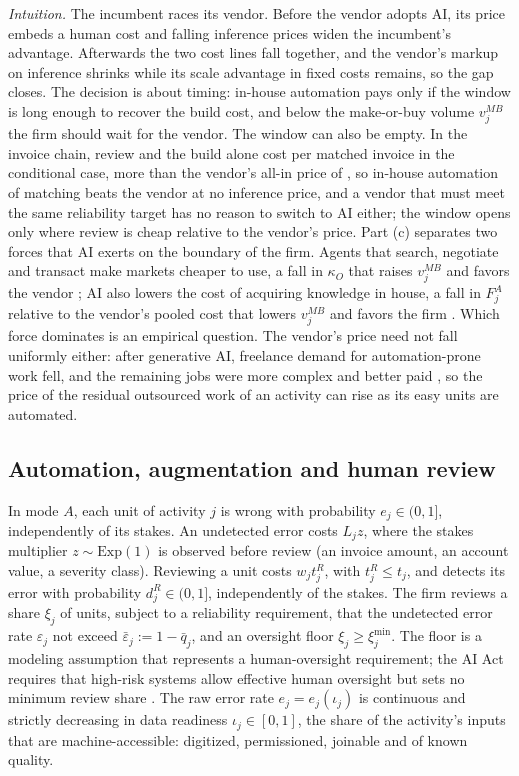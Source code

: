 \noindent\emph{Intuition.} The incumbent races its vendor. Before the vendor adopts AI, its price embeds a human cost and falling inference prices widen the incumbent's advantage. Afterwards the two cost lines fall together, and the vendor's markup on inference shrinks while its scale advantage in fixed costs remains, so the gap closes. The decision is about timing: in-house automation pays only if the window is long enough to recover the build cost, and below the make-or-buy volume $v^{MB}_j$ the firm should wait for the vendor. The window can also be empty. In the invoice chain, review and the build alone cost \icWinCzeroA{} per matched invoice in the conditional case, more than the vendor's all-in price of \icMatchO, so in-house automation of matching beats the vendor at no inference price, and a vendor that must meet the same reliability target has no reason to switch to AI either; the window opens only where review is cheap relative to the vendor's price. Part (c) separates two forces that AI exerts on the boundary of the firm. Agents that search, negotiate and transact make markets cheaper to use, a fall in $\kappa_O$ that raises $v^{MB}_j$ and favors the vendor \citep{shahidi2025coasean}; AI also lowers the cost of acquiring knowledge in house, a fall in $F^A_j$ relative to the vendor's pooled cost that lowers $v^{MB}_j$ and favors the firm \citep{garicano2026vanishing}. Which force dominates is an empirical question. The vendor's price need not fall uniformly either: after generative AI, freelance demand for automation-prone work fell, and the remaining jobs were more complex and better paid \citep{hui2024short,demirci2025who}, so the price of the residual outsourced work of an activity can rise as its easy units are automated.

\subsection{Automation, augmentation and human review}\label{sec:tasks-review}

\begin{assumption}\label{ass:tasks-review}
In mode $A$, each unit of activity $j$ is wrong with probability $e_j\in(0,1]$, independently of its stakes. An undetected error costs $L_jz$, where the stakes multiplier $z\sim\mathrm{Exp}(1)$ is observed before review (an invoice amount, an account value, a severity class). Reviewing a unit costs $w_jt^R_j$, with $t^R_j\le t_j$, and detects its error with probability $d^R_j\in(0,1]$, independently of the stakes. The firm reviews a share $\xi_j$ of units, subject to a reliability requirement, that the undetected error rate $\varepsilon_j$ not exceed $\bar\varepsilon_j:=1-\bar q_j$, and an oversight floor $\xi_j\ge\xi^{\min}_j$. The floor is a modeling assumption that represents a human-oversight requirement; the AI Act requires that high-risk systems allow effective human oversight but sets no minimum review share \citep{eu2024regulation}. The raw error rate $e_j=e_j(\iota_j)$ is continuous and strictly decreasing in data readiness $\iota_j\in[0,1]$, the share of the activity's inputs that are machine-accessible: digitized, permissioned, joinable and of known quality.
\end{assumption}

